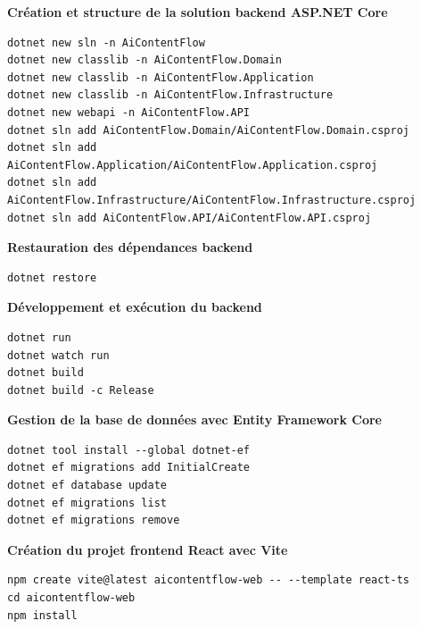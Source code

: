 \vspace{0.5cm}

\textbf{Création et structure de la solution backend ASP.NET Core}

\begin{verbatim}
dotnet new sln -n AiContentFlow
dotnet new classlib -n AiContentFlow.Domain
dotnet new classlib -n AiContentFlow.Application
dotnet new classlib -n AiContentFlow.Infrastructure
dotnet new webapi -n AiContentFlow.API
dotnet sln add AiContentFlow.Domain/AiContentFlow.Domain.csproj
dotnet sln add AiContentFlow.Application/AiContentFlow.Application.csproj
dotnet sln add AiContentFlow.Infrastructure/AiContentFlow.Infrastructure.csproj
dotnet sln add AiContentFlow.API/AiContentFlow.API.csproj
\end{verbatim}

\vspace{0.3cm}

\textbf{Restauration des dépendances backend}

\begin{verbatim}
dotnet restore
\end{verbatim}

\vspace{0.3cm}

\textbf{Développement et exécution du backend}

\begin{verbatim}
dotnet run
dotnet watch run
dotnet build
dotnet build -c Release
\end{verbatim}

\vspace{0.3cm}

\textbf{Gestion de la base de données avec Entity Framework Core}

\begin{verbatim}
dotnet tool install --global dotnet-ef
dotnet ef migrations add InitialCreate
dotnet ef database update
dotnet ef migrations list
dotnet ef migrations remove
\end{verbatim}

\vspace{0.5cm}

\textbf{Création du projet frontend React avec Vite}

\begin{verbatim}
npm create vite@latest aicontentflow-web -- --template react-ts
cd aicontentflow-web
npm install
\end{verbatim}

\vspace{0.3cm}

